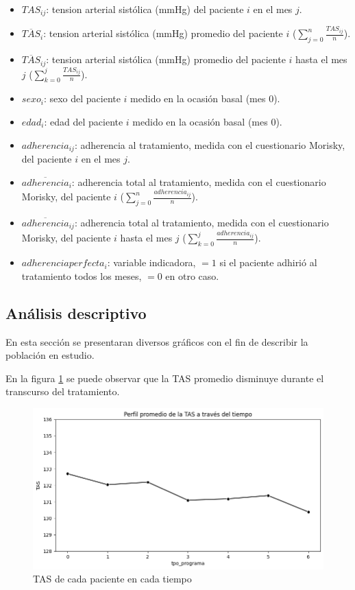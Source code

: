 \documentclass[spanish]{article}
\numberwithin{figure}{subsection}
\numberwithin{equation}{subsection}
\numberwithin{table}{subsection}
\begin{document}
\begin{itemize}
	\item $TAS_{ij}$: tension arterial sistólica (mmHg) del paciente $i$ en el
	mes $j$.
	\item $\overline{TAS}_{i}$: tension arterial sistólica (mmHg) promedio del
	paciente $i$ ($\sum_{j=0}^n \frac{TAS_{ij}}{n}$).
	\item $\overline{TAS}_{ij}$: tension arterial sistólica (mmHg) promedio del
	paciente $i$ hasta el mes $j$ ($\sum_{k=0}^j \frac{TAS_{ij}}{n}$).
	\item $sexo_i$: sexo del paciente $i$ medido en la ocasión basal (mes 0).
	\item $edad_i$: edad del paciente $i$ medido en la ocasión basal (mes 0).
	\item $adherencia_{ij}$: adherencia al tratamiento, medida con el
	cuestionario Morisky, del paciente $i$ en el mes $j$.
	\item $\overline{adherencia}_i$: adherencia total al tratamiento, medida con
	el cuestionario Morisky, del paciente $i$ ($\sum_{j=0}^n
	\frac{adherencia_{ij}}{n}$).
	\item $\overline{adherencia}_{ij}$: adherencia total al tratamiento, medida
	con el cuestionario Morisky, del paciente $i$ hasta el mes $j$
	($\sum_{k=0}^j \frac{adherencia_{ij}}{n}$).
	\item $adherencia perfecta_i$: variable indicadora, $=1$ si el paciente
	adhirió al tratamiento todos los meses, $=0$ en otro caso.
\end{itemize}

\subsection{Análisis descriptivo}

En esta sección se presentaran diversos gráficos con el fin de describir la
población en estudio.

En la figura \ref{TAS_vs_tpo} se puede observar que la TAS promedio disminuye
durante el transcurso del tratamiento.

\begin{figure}[H]
	\centering
	\includegraphics[scale=0.5]{img/TAS_vs_tpo.png}
	\caption{TAS de cada paciente en cada tiempo}
	\label{TAS_vs_tpo}
\end{figure}
\end{document}
